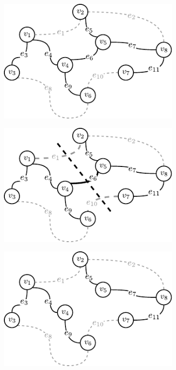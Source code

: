 \begin{figure}[!htbp]
	\null\hfill
	\begin{subfigure}[b]{0.3\textwidth}
		\includegraphics[width=\textwidth]{Chapter_I/CUT-example/a}
		\caption{}
		\label{fig:cut:a}
	\end{subfigure}
	\hfill
	\begin{subfigure}[b]{0.3\textwidth}
		\includegraphics[width=\textwidth]{Chapter_I/CUT-example/b}
		\caption{}
		\label{fig:cut:b}
	\end{subfigure}
	\hfill
	\begin{subfigure}[b]{0.3\textwidth}
		\includegraphics[width=\textwidth]{Chapter_I/CUT-example/c}

\end{subfigure}
\end{figure}
